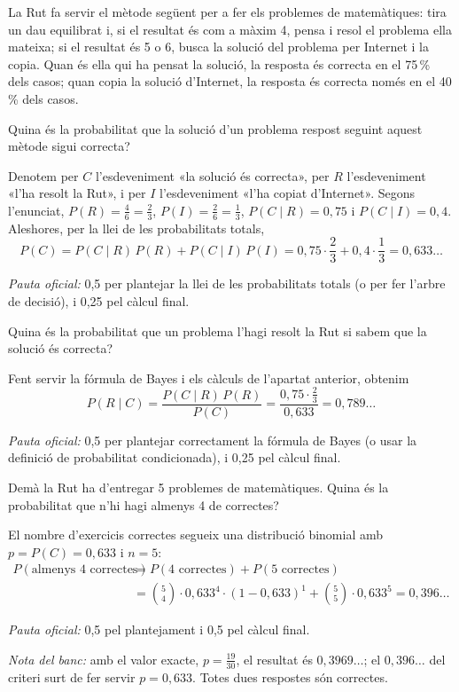 La Rut fa servir el mètode següent per a fer els problemes de matemàtiques: tira un dau equilibrat i, si el
resultat és com a màxim 4, pensa i resol el problema ella mateixa; si el resultat és 5 o 6, busca la solució del
problema per Internet i la copia. Quan és ella qui ha pensat la solució, la resposta és correcta en el 75\,\% dels
casos; quan copia la solució d'Internet, la resposta és correcta només en el 40\,\% dels casos.

\begin{apartats}

Quina és la probabilitat que la solució d'un problema respost seguint aquest mètode sigui correcta?

\begin{solucio}
Denotem per $C$ l'esdeveniment «la solució és correcta», per $R$ l'esdeveniment «l'ha resolt la Rut», i per $I$
l'esdeveniment «l'ha copiat d'Internet». Segons l'enunciat, $P(R)=\frac46=\frac23$, $P(I)=\frac26=\frac13$,
$P(C\mid R)=0{,}75$ i $P(C\mid I)=0{,}4$. Aleshores, per la llei de les probabilitats totals,
\[
P(C)=P(C\mid R)\,P(R)+P(C\mid I)\,P(I)=0{,}75\cdot\frac23+0{,}4\cdot\frac13=0{,}633\ldots
\]

\textit{Pauta oficial:} 0,5 per plantejar la llei de les probabilitats totals (o per fer l'arbre de decisió), i
0,25 pel càlcul final.
\end{solucio}

Quina és la probabilitat que un problema l'hagi resolt la Rut si sabem que la solució és correcta?

\begin{solucio}
Fent servir la fórmula de Bayes i els càlculs de l'apartat anterior, obtenim
\[
P(R\mid C)=\frac{P(C\mid R)\,P(R)}{P(C)}=\frac{0{,}75\cdot\frac23}{0{,}633}=0{,}789\ldots
\]

\textit{Pauta oficial:} 0,5 per plantejar correctament la fórmula de Bayes (o usar la definició de probabilitat
condicionada), i 0,25 pel càlcul final.
\end{solucio}

Demà la Rut ha d'entregar 5 problemes de matemàtiques. Quina és la probabilitat que n'hi hagi almenys 4 de
correctes?

\begin{solucio}
El nombre d'exercicis correctes segueix una distribució binomial amb $p=P(C)=0{,}633$ i $n=5$:
\begin{align*}
P(\text{almenys 4 correctes})&=P(\text{4 correctes})+P(\text{5 correctes})\\
&=\binom54\cdot0{,}633^4\cdot(1-0{,}633)^1+\binom55\cdot0{,}633^5=0{,}396\ldots
\end{align*}

\textit{Pauta oficial:} 0,5 pel plantejament i 0,5 pel càlcul final.

\textit{Nota del banc:} amb el valor exacte, $p=\frac{19}{30}$, el resultat és $0{,}3969\ldots$; el
$0{,}396\ldots$ del criteri surt de fer servir $p=0{,}633$. Totes dues respostes són correctes.
\end{solucio}

\end{apartats}
